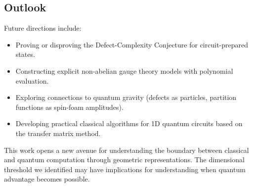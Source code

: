 \subsection{Outlook}

Future directions include:
\begin{itemize}
    \item Proving or disproving the Defect-Complexity Conjecture for circuit-prepared states.
    \item Constructing explicit non-abelian gauge theory models with polynomial evaluation.
    \item Exploring connections to quantum gravity (defects as particles, partition functions as spin-foam amplitudes).
    \item Developing practical classical algorithms for 1D quantum circuits based on the transfer matrix method.
\end{itemize}

This work opens a new avenue for understanding the boundary between classical and quantum computation through geometric representations. The dimensional threshold we identified may have implications for understanding when quantum advantage becomes possible.
